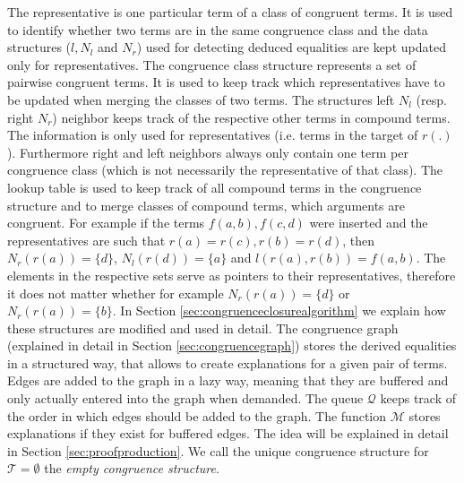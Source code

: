 The representative is one particular term of a class of congruent terms.
It is used to identify whether two terms are in the same congruence class and the data structures ($l, N_l$ and $N_r$) used for detecting deduced equalities are kept updated only for representatives.
The congruence class structure represents a set of pairwise congruent terms.
It is used to keep track which representatives have to be updated when merging the classes of two terms.
The structures left $N_l$ (resp. right $N_r$) neighbor  keeps track of the respective other terms in compound terms.
The information is only used for representatives (i.e. terms in the target of $r(.)$).
Furthermore right and left neighbors always only contain one term per congruence class (which is not necessarily the representative of that class).
The lookup table is used to keep track of all compound terms in the congruence structure and to merge classes of compound terms, which arguments are congruent.
For example if the terms $f(a,b),f(c,d)$ were inserted and the representatives are such that $r(a) = r(c), r(b) = r(d)$, then $N_r(r(a)) = \{d\}$, $N_l(r(d)) = \{a\}$ and $l(r(a),r(b)) = f(a,b)$.
The elements in the respective sets serve as pointers to their representatives, therefore it does not matter whether for example $N_r(r(a)) = \{d\}$ or $N_r(r(a)) = \{b\}$.
In Section \ref{sec:congruenceclosurealgorithm} we explain how these structures are modified and used in detail.
The congruence graph (explained in detail in Section \ref{sec:congruencegraph}) stores the derived equalities in a structured way, that allows to create explanations for a given pair of terms.
Edges are added to the graph in a lazy way, meaning that they are buffered and only actually entered into the graph when demanded.
The queue $\mathcal{Q}$ keeps track of the order in which edges should be added to the graph.
The function $\mathcal{M}$ stores explanations if they exist for buffered edges.
The idea will be explained in detail in Section \ref{sec:proofproduction}.
We call the unique congruence structure for $\mathcal{T} = \emptyset$ the \emph{empty congruence structure}.

\FloatBarrier

